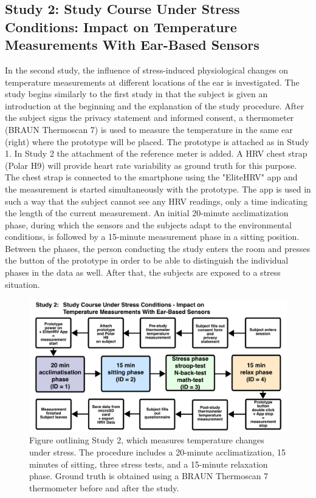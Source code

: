 \subsection{Study 2: Study Course Under Stress Conditions: Impact on Temperature Measurements With Ear-Based Sensors}
\label{ch:Design:Study:Study2}
In the second study, the influence of stress-induced physiological changes on temperature measurements at different locations of the ear is investigated. 
The study begins similarly to the first study in that the subject is given an introduction at the beginning and the explanation of the study procedure.
After the subject signs the privacy statement and informed consent, a thermometer (BRAUN Thermoscan 7) is used to measure the temperature in the same ear (right) where the prototype will be placed.
The prototype is attached as in Study 1.
In Study 2 the attachment of the reference meter is added.
A HRV chest strap (Polar H9) will provide heart rate variability as ground truth for this purpose.
The chest strap is connected to the smartphone using the "EliteHRV" app and the measurement is started simultaneously with the prototype.
The app is used in such a way that the subject cannot see any HRV readings, only a time indicating the length of the current measurement.
An initial 20-minute acclimatization phase, during which the sensors and the subjects adapt to the environmental conditions, is followed by a 15-minute measurement phase in a sitting position.
Between the phases, the person conducting the study enters the room and presses the button of the prototype in order to be able to distinguish the individual phases in the data as well.
After that, the subjects are exposed to a stress situation. 
\begin{figure}[!t]
    \centering
    \includegraphics[width=\textwidth]{thesis-doc/images/study2/Procedure2_new.pdf}
    \caption{Figure outlining Study 2, which measures temperature changes under stress. The procedure includes a 20-minute acclimatization, 15 minutes of sitting, three stress tests, and a 15-minute relaxation phase. Ground truth is obtained using a BRAUN Thermoscan 7 thermometer before and after the study.}
    \label{fig:design:study2:procedure}
\end{figure}
